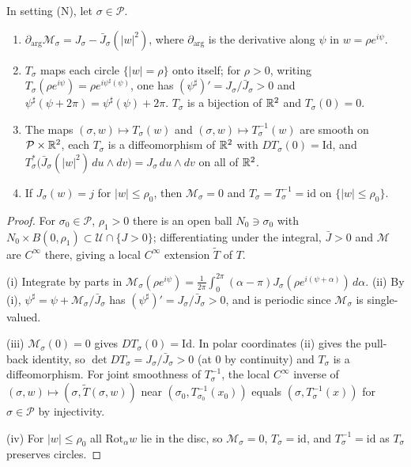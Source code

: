 \begin{lemma}\label{lem:pln-rotation}
In setting (N), let $\sigma\in\mathcal P$.
\begin{enumerate}[label=(\roman*)]
\item $\partial_{\arg}\mathcal M_\sigma=J_\sigma-\bar J_\sigma(|w|^2)$, where $\partial_{\arg}$ is the
 derivative along $\psi$ in $w=\rho e^{i\psi}$.
\item $T_\sigma$ maps each circle $\{|w|=\rho\}$ onto itself; for $\rho>0$, writing
 $T_\sigma(\rho e^{i\psi})=\rho e^{i\psi^\sharp(\psi)}$, one has $(\psi^\sharp)'=J_\sigma/\bar J_\sigma>0$ and
 $\psi^\sharp(\psi+2\pi)=\psi^\sharp(\psi)+2\pi$. $T_\sigma$ is a bijection of $\mathbb{R}^2$ and $T_\sigma(0)=0$.
\item The maps $(\sigma,w)\mapsto T_\sigma(w)$ and $(\sigma,w)\mapsto T_\sigma^{-1}(w)$ are smooth on
 $\mathcal P\times\mathbb{R}^2$, each $T_\sigma$ is a diffeomorphism of $\mathbb{R}^2$ with $DT_\sigma(0)=\mathrm{Id}$, and
 $T_\sigma^*\bigl(\bar J_\sigma(|w|^2)\,du\wedge dv\bigr)=J_\sigma\,du\wedge dv$ on all of $\mathbb{R}^2$.
\item If $J_\sigma(w)=j$ for $|w|\le\rho_0$, then $\mathcal M_\sigma=0$ and $T_\sigma=T_\sigma^{-1}=\mathrm{id}$
 on $\{|w|\le\rho_0\}$.
\end{enumerate}
\end{lemma}

\begin{proof}
For $\sigma_0\in\mathcal P$, $\rho_1>0$ there is an open ball $N_0\ni\sigma_0$ with $N_0\times B(0,\rho_1)\subset\mathcal U\cap\{J>0\}$; differentiating under the integral, $\bar J>0$ and $\mathcal M$ are $C^\infty$ there, giving a local $C^\infty$ extension $\tilde T$ of $T$.

(i) Integrate by parts in $\mathcal M_\sigma(\rho e^{i\psi})=\frac1{2\pi}\int_0^{2\pi}(\alpha-\pi)J_\sigma(\rho e^{i(\psi+\alpha)})\,d\alpha$. (ii) By (i), $\psi^\sharp=\psi+\mathcal M_\sigma/\bar J_\sigma$ has $(\psi^\sharp)'=J_\sigma/\bar J_\sigma>0$, and is periodic since $\mathcal M_\sigma$ is single-valued.

(iii) $\mathcal M_\sigma(0)=0$ gives $DT_\sigma(0)=\mathrm{Id}$. In polar coordinates (ii) gives the pull-back identity, so $\det DT_\sigma=J_\sigma/\bar J_\sigma>0$ (at $0$ by continuity) and $T_\sigma$ is a diffeomorphism. For joint smoothness of $T_\sigma^{-1}$, the local $C^\infty$ inverse of $(\sigma,w)\mapsto(\sigma,\tilde T(\sigma,w))$ near $(\sigma_0,T_{\sigma_0}^{-1}(x_0))$ equals $(\sigma,T_\sigma^{-1}(x))$ for $\sigma\in\mathcal P$ by injectivity.

(iv) For $|w|\le\rho_0$ all $\mathrm{Rot}_\alpha w$ lie in the disc, so $\mathcal M_\sigma=0$, $T_\sigma=\mathrm{id}$, and $T_\sigma^{-1}=\mathrm{id}$ as $T_\sigma$ preserves circles.
\end{proof}

